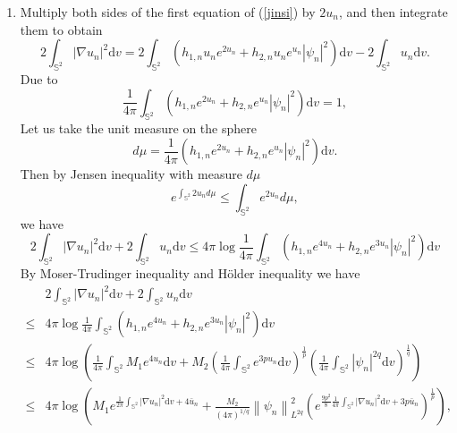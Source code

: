 \documentclass[a4paper, 12pt]{article}
\begin{document}
\begin{enumerate}[label=\roman*), leftmargin=*]
	\setcounter{enumi}{0}
	\item Multiply both sides of the first equation of (\ref{jinsi}) by $2u_n$, and then integrate them to obtain
	$$
	2\int_{{\mathbb{S}^2}} {{{\left| {\nabla u_n} \right|}^2}{\text{d}{v}}}  = 2\int_{{\mathbb{S}^2}} {\left( {{h_{1,n}}u_n{e^{2u_n}} + {h_{2,n}}u_n{e^{u_n}}{{\left| \psi_n  \right|}^2}} \right){\text{d}{v}}}  - 2\int_{{\mathbb{S}^2}} u_n{\text{d}{v}}.
	$$
	Due to
	\[
	\frac{1}{4\pi}\int_{{\mathbb{S}^2}} {\left( {{h_{1,n}}{e^{2{u_n}}} +{h_{2,n}} {e^{u_n}}{{\left| \psi_n  \right|}^2}} \right){\text{d}{v}} = 1}, \]
	Let us take the unit measure on the sphere
	\[
	d\mu=\frac{1}{4\pi} {\left( {{h_{1,n}}{e^{2{u_n}}} +{h_{2,n}} {e^{u_n}}{{\left| \psi_n  \right|}^2}} \right){\text{d}{v}}}.\]
	Then by Jensen inequality with measure $d\mu$
	$$
	e^{\int_{\mathbb{S}^2}2u_nd\mu}\leq \int_{\mathbb{S}^2}e^{2u_n}d\mu,
	$$
	we have
	$$
	2\int_{{\mathbb{S}^2}} {{{\left| {\nabla u_n} \right|}^2}{\text{d}{v}}}  + 2\int_{{\mathbb{S}^2}} u_n{\text{d}{v}} \leq 4\pi\log \frac{1}{4\pi}\int_{{\mathbb{S}^2}} {\left( {{h_{1,n}}{e^{4u_n}} +{h_{2,n}} {e^{3u_n}}{{\left| \psi_n  \right|}^2}} \right){\text{d}{v}}}
	$$
	By Moser-Trudinger inequality and H\"{o}lder inequality we have
	\begin{equation}\label{S-L-Holder}
		\begin{aligned}
			&2\int_{{\mathbb{S}^2}} {{{\left| {\nabla u_n} \right|}^2}{\text{d}{v}}}  + 2\int_{{\mathbb{S}^2}} u_n{\text{d}{v}} \\
			\leq &4\pi\log \frac{1}{4\pi}\int_{{\mathbb{S}^2}} {\left( {{h_{1,n}}{e^{4u_n}} + {h_{2,n}}{e^{3u_n}}{{\left| \psi_n  \right|}^2}} \right){\text{d}{v}}}  \\
			\leq& 4\pi\log \left(\frac{1}{4\pi} {\int_{{\mathbb{S}^2}} {M_1{e^{4u_n}}{\text{d}{v}}}  +M_2 {{\left( {\frac{1}{4\pi}\int_{{\mathbb{S}^2}} {{e^{3pu_n}}{\text{d}{v}}} } \right)}^{\frac{1}{p}}}{{\left( \frac{1}{4\pi}{\int_{{\mathbb{S}^2}} {{{\left| \psi_n  \right|}^{2q}}} {\text{d}{v}}} \right)}^{\frac{1}{q}}}} \right) \\
			\leq &4\pi\log \left( {M_1{e^{\frac{1}{2\pi}\int_{{\mathbb{S}^2}} {{{\left| {\nabla u_n} \right|}^2}{\text{d}{v}}}  + 4\bar u_n}} +\frac{{{M_2}}}{{{{\left( {4\pi } \right)}^{1/q}}}} {{\left\| \psi_n  \right\|^2_{L^{2q}}}}{{\left( {{e^{\frac{{9p^2}}{8}\frac{1}{4\pi}\int_{{\mathbb{S}^2}} {{{\left| {\nabla u_n} \right|}^2}{\text{d}{v}}}  + 3p\bar u_n}}} \right)}^{\frac{1}{p}}}} \right) ,
		\end{aligned}

\end{equation}
\end{enumerate}
\end{document}

